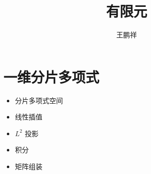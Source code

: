 \documentclass{article}
\begin{document}
\title{有限元}
\author{王鹏祥}
\date{\chntoday}
\maketitle

\section{一维分片多项式}

\begin{itemize}
    \item 分片多项式空间
    \item 线性插值
    \item $L^2$ 投影
    \item 积分
    \item 矩阵组装
\end{itemize}
\end{document}

